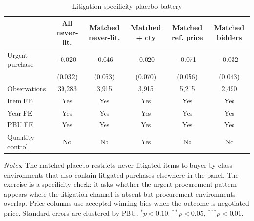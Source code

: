 \begin{table}[ht]
\centering
\caption{Litigation-specificity placebo battery}
\label{tab:h7_placebo_battery}
\begin{threeparttable}
\small
\setlength{\tabcolsep}{4.5pt}
\begin{tabular}{lccccc}
\toprule
 & All never-lit. & Matched never-lit. & Matched + qty & Matched ref. price & Matched bidders \\
\midrule
Urgent purchase & -0.020 & -0.046 & -0.020 & -0.071 & -0.032 \\
 & (0.032) & (0.053) & (0.070) & (0.056) & (0.043) \\
\addlinespace
Observations & 39{,}283 & 3{,}915 & 3{,}915 & 5{,}215 & 2{,}490 \\
Item FE & Yes & Yes & Yes & Yes & Yes \\
Year FE & Yes & Yes & Yes & Yes & Yes \\
PBU FE & Yes & Yes & Yes & Yes & Yes \\
Quantity control & No & No & Yes & No & No \\
\bottomrule
\end{tabular}
\begin{tablenotes}[flushleft]\footnotesize
\item \textit{Notes:} The matched placebo restricts never-litigated items to buyer-by-class environments that also contain litigated purchases elsewhere in the panel. The exercise is a specificity check: it asks whether the urgent-procurement pattern appears where the litigation channel is absent but procurement environments overlap. Price columns use accepted winning bids when the outcome is negotiated price. Standard errors are clustered by PBU. $^{*}p<0.10$, $^{**}p<0.05$, $^{***}p<0.01$.
\end{tablenotes}
\end{threeparttable}
\end{table}
